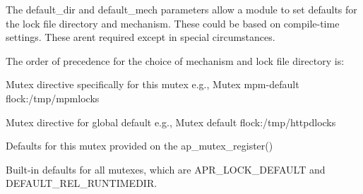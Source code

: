 The default\+\_\+dir and default\+\_\+mech parameters allow a module to set defaults for the lock file directory and mechanism. These could be based on compile-\/time settings. These aren\textquotesingle{}t required except in special circumstances.

The order of precedence for the choice of mechanism and lock file directory is\+:


\begin{DoxyEnumerate}
\item Mutex directive specifically for this mutex e.\+g., Mutex mpm-\/default flock\+:/tmp/mpmlocks
\item Mutex directive for global default e.\+g., Mutex default flock\+:/tmp/httpdlocks
\item Defaults for this mutex provided on the ap\+\_\+mutex\+\_\+register()
\item Built-\/in defaults for all mutexes, which are A\+P\+R\+\_\+\+L\+O\+C\+K\+\_\+\+D\+E\+F\+A\+U\+LT and D\+E\+F\+A\+U\+L\+T\+\_\+\+R\+E\+L\+\_\+\+R\+U\+N\+T\+I\+M\+E\+D\+IR.
\end{DoxyEnumerate}


